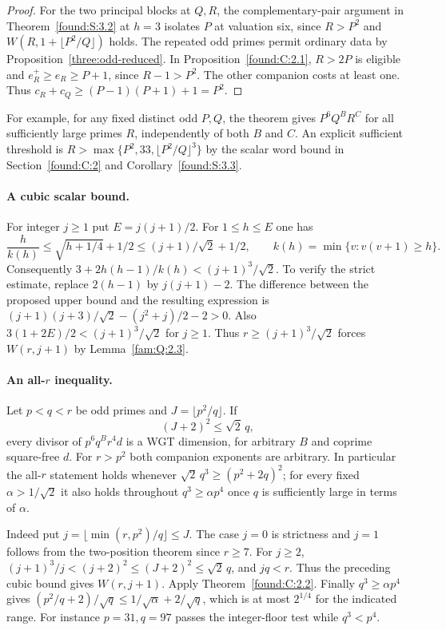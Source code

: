 \documentclass[11pt,a4paper]{article}
\numberwithin{equation}{section}
\theoremstyle{remark}
\begin{document}
\begin{proof}
For the two principal blocks at $Q,R$, the complementary-pair argument
in Theorem~\ref{found:S:3.2} at $h=3$ isolates $P$ at valuation six,
since $R>P^2$ and $W(R,1+\lfloor P^2/Q\rfloor)$ holds.
The repeated odd primes permit ordinary data by
Proposition~\ref{three:odd-reduced}. In Proposition~\ref{found:C:2.1},
$R>2P$ is eligible and $e_R^+\ge e_R\ge P+1$, since $R-1>P^2$.
The other companion costs at least one. Thus
$c_R+c_Q\ge(P-1)(P+1)+1=P^2$.
\end{proof}

For example, for any fixed distinct odd $P,Q$, the theorem gives
$P^6 Q^B R^C$ for all sufficiently large primes $R$, independently
of both $B$ and $C$. An explicit sufficient threshold is
$R>\max\{P^2,33,\lfloor P^2/Q\rfloor^3\}$ by the scalar word bound in Section~\ref{found:C:2} and Corollary~\ref{found:S:3.3}.

\paragraph{A cubic scalar bound.}
For integer $j\ge1$ put $E=j(j+1)/2$. For $1\le h\le E$ one has
\[
 \frac{h}{k(h)}\le \sqrt{h+1/4}+1/2\le(j+1)/\sqrt2+1/2,
 \qquad k(h)=\min\{v:v(v+1)\ge h\}.
\]
Consequently $3+2h(h-1)/k(h)<(j+1)^3/\sqrt2$. To verify the strict estimate, replace $2(h-1)$ by $j(j+1)-2$. The difference between the proposed upper bound and the resulting expression is $(j+1)(j+3)/\sqrt2-(j^2+j)/2-2>0$. Also $3(1+2E)/2<(j+1)^3/\sqrt2$ for $j\ge1$. Thus $r\ge(j+1)^3/\sqrt2$ forces $W(r,j+1)$ by Lemma~\ref{fam:Q:2.3}.

\paragraph{An all-$r$ inequality.}
Let $p<q<r$ be odd primes and $J=\lfloor p^2/q\rfloor$. If
\[
                    (J+2)^2\le\sqrt2\,q ,
\]
every divisor of $p^6 q^B r^4d$ is a WGT dimension, for arbitrary
$B$ and coprime square-free $d$. For $r>p^2$ both companion exponents
are arbitrary. In particular the all-$r$ statement holds whenever
$\sqrt2\,q^3\ge(p^2+2q)^2$; for every fixed
$\alpha>1/\sqrt2$ it also holds throughout $q^3\ge\alpha p^4$
once $q$ is sufficiently large in terms of $\alpha$.

Indeed put $j=\lfloor\min(r,p^2)/q\rfloor\le J$. The case $j=0$
is strictness and $j=1$ follows from the two-position theorem since
$r\ge7$. For $j\ge2$, $(j+1)^3/j<(j+2)^2\le(J+2)^2\le\sqrt2\,q$,
and $jq<r$. Thus the preceding cubic bound gives $W(r,j+1)$.
Apply Theorem~\ref{found:C:2.2}.
Finally $q^3\ge\alpha p^4$ gives
$(p^2/q+2)/\sqrt q\le1/\sqrt\alpha+2/\sqrt q$,
which is at most $2^{1/4}$ for the indicated range. For instance
$p=31,q=97$ passes the integer-floor test while $q^3<p^4$.
\end{document}
